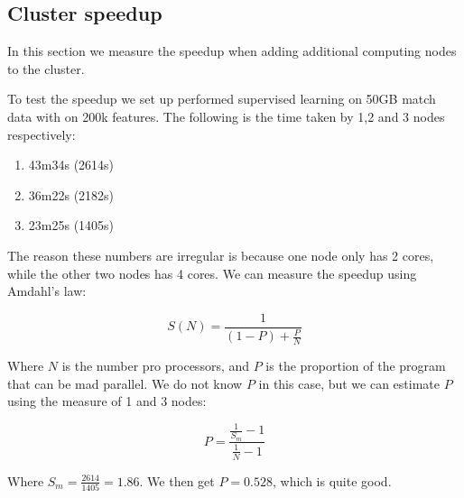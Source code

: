 \subsection{Cluster speedup}\label{sec:speedup}
In this section we measure the speedup when adding additional computing nodes to the cluster.

To test the speedup we set up performed supervised learning on 50GB match data with on 200k features. The following is the time taken by 1,2 and 3 nodes respectively:

\begin{enumerate}
    \item 43m34s (2614s)
    \item 36m22s (2182s)
    \item 23m25s (1405s)
\end{enumerate}

The reason these numbers are irregular is because one node only has 2 cores, while the other two nodes has 4 cores. We can measure the speedup using Amdahl's law:

\[S(N) = \frac{1}{(1-P)+\frac{P}{N}}\]

Where $N$ is the number pro processors, and $P$ is the proportion of the program that can be mad parallel. We do not know $P$ in this case, but we can estimate $P$ using the measure of 1 and 3 nodes:

\[P = \frac{\frac{1}{S_m}-1}{\frac{1}{N}-1}  \]

Where \( S_m=\frac{2614}{1405} = 1.86 \). We then get $P = 0.528$, which is quite good.